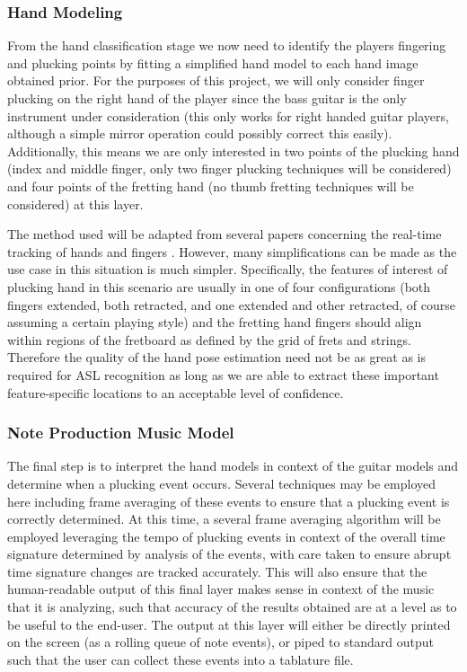 \subsubsection{Hand Modeling}
From the hand classification stage we now need to identify the players fingering and plucking points
by fitting a simplified hand model to each hand image obtained prior.
For the purposes of this project, we will only consider finger plucking on the right hand of the player
since the bass guitar is the only instrument under consideration
(this only works for right handed guitar players, although a simple mirror operation could possibly correct this easily).
Additionally, this means we are only interested in two points of the plucking hand
(index and middle finger, only two finger plucking techniques will be considered)
and four points of the fretting hand (no thumb fretting techniques will be considered) at this layer.
\par
The method used will be adapted from several papers concerning the real-time tracking of hands and fingers
\cite{aslhand,handposes,fingertracking}.
However, many simplifications can be made as the use case in this situation is much simpler.
Specifically, the features of interest of plucking hand in this scenario are usually in one of four configurations
(both fingers extended, both retracted, and one extended and other retracted, of course assuming a certain playing style)
and the fretting hand fingers should align within regions of the fretboard as defined by the grid of frets and strings.
Therefore the quality of the hand pose estimation need not be as great as is required for ASL recognition as long
as we are able to extract these important feature-specific locations to an acceptable level of confidence.

\subsubsection{Note Production Music Model}
The final step is to interpret the hand models in context of the guitar models and determine when a plucking event occurs.
Several techniques may be employed here including frame averaging of these events to ensure that a plucking event
is correctly determined.
At this time, a several frame averaging algorithm will be employed leveraging the tempo of plucking events in context of 
the overall time signature determined by analysis of the events, with care taken to ensure abrupt time signature changes
are tracked accurately.
This will also ensure that the human-readable output of this final layer makes sense in context of the music that it is
analyzing, such that accuracy of the results obtained are at a level as to be useful to the end-user.
The output at this layer will either be directly printed on the screen (as a rolling queue of note events),
or piped to standard output such that the user can collect these events into a tablature file.

